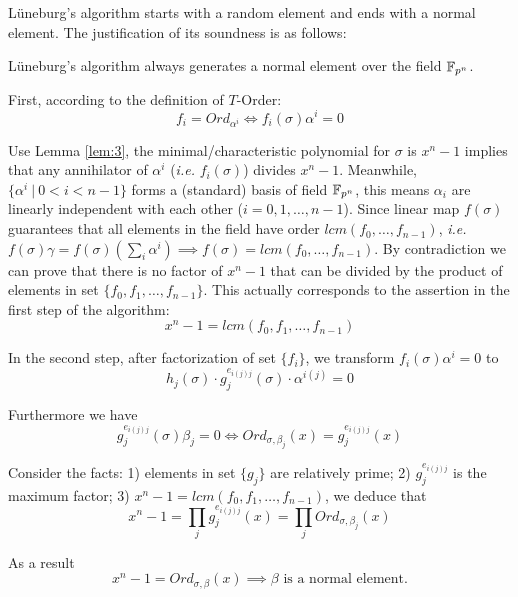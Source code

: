 L\"uneburg's algorithm starts with a random element and ends with a normal element. The justification of 
its soundness is as follows:
\begin{Proposition}
L\"uneburg's algorithm always generates a normal element over the field ${\mathbb{F}}_{p^n}$.
\end{Proposition}

\begin{Proof}
First, according to the definition of $T$-Order:
$$f_i = Ord_{\alpha^i} \Leftrightarrow f_i(\sigma)\alpha^i = 0$$

Use Lemma \ref{lem:3}, the minimal/characteristic polynomial for $\sigma$ is $x^n-1$ implies that
any annihilator of $\alpha^i$ ({\it i.e.} $f_i(\sigma)$) divides $x^n-1$. Meanwhile, $\{\alpha^i~|~0<i<n-1\}$ forms a (standard) basis
of field ${\mathbb{F}}_{p^n}$, this means $\alpha_i$ are linearly independent with each other ($i=0,1,\dots,n-1$).
Since linear map $f(\sigma)$ guarantees that all elements in the field 
have order $lcm(f_0,\dots,f_{n-1})$, {\it i.e.} $f(\sigma)\gamma = f(\sigma)(\sum_i \alpha^i) \implies f(\sigma) = lcm(f_0,\dots,f_{n-1})$.
By contradiction we can prove that there is no factor of $x^n-1$ that can be divided by the product 
of elements in set $\{f_0,f_1,\dots,f_{n-1}\}$. This actually corresponds to the assertion in the first step of the algorithm:
$$x^n-1 = lcm(f_0,f_1,\dots,f_{n-1})$$

In the second step, after factorization of set $\{f_i\}$, we transform $f_i(\sigma)\alpha^i=0$ to
$$h_j(\sigma)\cdot g_{j}^{e_{i(j)j}}(\sigma) \cdot \alpha^{i(j)} = 0$$

Furthermore we have 
$$g_{j}^{e_{i(j)j}}(\sigma)\beta_j = 0 \Leftrightarrow Ord_{\sigma,\beta_j}(x) = g_{j}^{e_{i(j)j}}(x)$$

Consider the facts: 1) elements in set $\{g_j\}$ are relatively prime; 2) $g_{j}^{e_{i(j)j}}$ is the maximum factor; 
3) $x^n-1 = lcm(f_0,f_1,\dots,f_{n-1})$, we deduce that 
$$x^n-1 = \prod_j g_{j}^{e_{i(j)j}}(x) = \prod_jOrd_{\sigma,\beta_j}(x)$$

As a result
$$x^n-1 = Ord_{\sigma,\beta}(x) \implies \beta\text{ is a normal element.}$$
\end{Proof}


